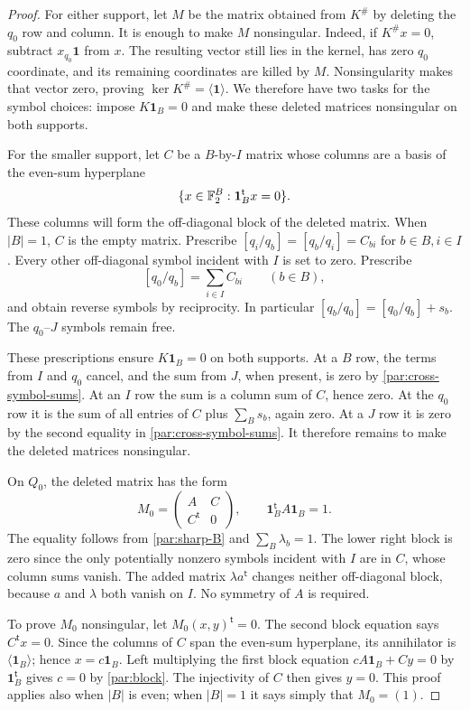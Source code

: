 \begin{proof}
For either support, let $M$ be the matrix obtained from $K^\#$ by
deleting the $q_0$ row and column. It is enough to make $M$ nonsingular.
Indeed, if $K^\#x=0$, subtract $x_{q_0}\mathbf1$ from $x$. The resulting
vector still lies in the kernel, has zero $q_0$ coordinate, and its
remaining coordinates are killed by $M$. Nonsingularity makes that
vector zero, proving $\ker K^\#=\langle\mathbf1\rangle$. We therefore
have two tasks for the symbol choices: impose $K\mathbf1_B=0$ and make
these deleted matrices nonsingular on both supports.

For the smaller support, let $C$ be a $B$-by-$I$ matrix whose columns
are a basis of the even-sum hyperplane
\[
 \{x\in\mathbb F_2^B:\mathbf1_B^{\mathsf t}x=0\}.
\]
These columns will form the off-diagonal block of the deleted matrix.
When $|B|=1$, $C$ is the empty matrix. Prescribe
$[q_i/q_b]=[q_b/q_i]=C_{bi}$ for $b\in B,i\in I$.
Every other off-diagonal symbol incident with $I$ is set to zero.
Prescribe
\[
 [q_0/q_b]=\sum_{i\in I}C_{bi}\qquad(b\in B),
\]
and obtain reverse symbols by reciprocity. In particular
$[q_b/q_0]=[q_0/q_b]+s_b$. The $q_0$--$J$ symbols remain free.

These prescriptions ensure $K\mathbf1_B=0$ on both supports.
At a $B$ row, the terms from $I$ and $q_0$ cancel, and the sum
from $J$, when present, is zero by \eqref{par:cross-symbol-sums}.
At an $I$ row the sum is a column sum of $C$, hence zero. At the
$q_0$ row it is the sum of all entries of $C$ plus $\sum_B s_b$,
again zero. At a $J$ row it is zero by the second equality in
\eqref{par:cross-symbol-sums}. It therefore remains to make the deleted
matrices nonsingular.

On $Q_0$, the deleted matrix has the form
\begin{equation}\label{par:block}
 M_0=\begin{pmatrix}A&C\\ C^{\mathsf t}&0\end{pmatrix},
 \qquad \mathbf1_B^{\mathsf t}A\mathbf1_B=1.
\end{equation}
The equality follows from \eqref{par:sharp-B} and
$\sum_B\lambda_b=1$. The lower right block is zero since the
only potentially nonzero symbols incident with $I$ are in $C$,
whose column sums vanish. The added matrix $\lambda a^{\mathsf t}$
changes neither off-diagonal block, because $a$ and $\lambda$
both vanish on $I$. No symmetry of $A$ is required.

To prove $M_0$ nonsingular, let $M_0(x,y)^{\mathsf t}=0$.
The second block equation says $C^{\mathsf t}x=0$. Since the
columns of $C$ span the even-sum hyperplane, its annihilator is
$\langle\mathbf1_B\rangle$; hence $x=c\mathbf1_B$.
Left multiplying the first block equation
$cA\mathbf1_B+Cy=0$ by $\mathbf1_B^{\mathsf t}$ gives $c=0$
by \eqref{par:block}. The injectivity of $C$ then gives $y=0$.
This proof applies also when $|B|$ is even; when $|B|=1$ it says
simply that $M_0=(1)$.


\end{proof}
